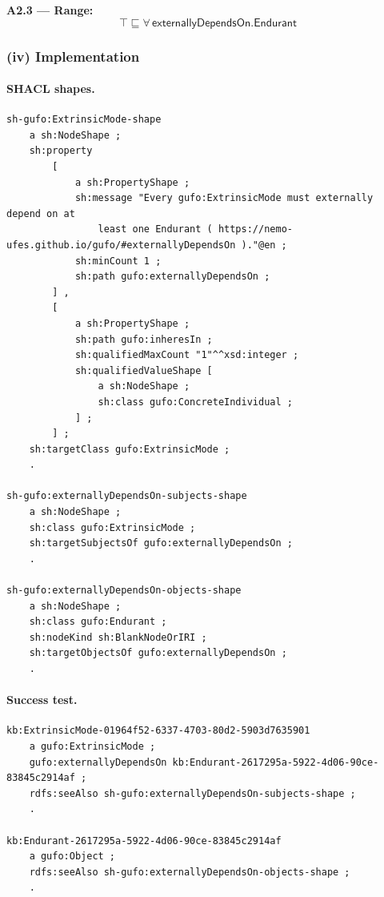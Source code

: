 \documentclass[12pt,a4paper]{article}
\begin{document}
\textbf{A2.3 --- Range:}
\begin{equation*}
  \top \sqsubseteq \forall\,\mathsf{externallyDependsOn}.\mathsf{Endurant}
\end{equation*}

\subsubsection*{(iv) Implementation}

\paragraph{SHACL shapes.}

\begin{lstlisting}[style=turtlestyle]
sh-gufo:ExtrinsicMode-shape
    a sh:NodeShape ;
    sh:property
        [
            a sh:PropertyShape ;
            sh:message "Every gufo:ExtrinsicMode must externally depend on at
                least one Endurant ( https://nemo-ufes.github.io/gufo/#externallyDependsOn )."@en ;
            sh:minCount 1 ;
            sh:path gufo:externallyDependsOn ;
        ] ,
        [
            a sh:PropertyShape ;
            sh:path gufo:inheresIn ;
            sh:qualifiedMaxCount "1"^^xsd:integer ;
            sh:qualifiedValueShape [
                a sh:NodeShape ;
                sh:class gufo:ConcreteIndividual ;
            ] ;
        ] ;
    sh:targetClass gufo:ExtrinsicMode ;
    .

sh-gufo:externallyDependsOn-subjects-shape
    a sh:NodeShape ;
    sh:class gufo:ExtrinsicMode ;
    sh:targetSubjectsOf gufo:externallyDependsOn ;
    .

sh-gufo:externallyDependsOn-objects-shape
    a sh:NodeShape ;
    sh:class gufo:Endurant ;
    sh:nodeKind sh:BlankNodeOrIRI ;
    sh:targetObjectsOf gufo:externallyDependsOn ;
    .
\end{lstlisting}

\paragraph{Success test.}

\begin{lstlisting}[style=turtlestyle]
kb:ExtrinsicMode-01964f52-6337-4703-80d2-5903d7635901
    a gufo:ExtrinsicMode ;
    gufo:externallyDependsOn kb:Endurant-2617295a-5922-4d06-90ce-83845c2914af ;
    rdfs:seeAlso sh-gufo:externallyDependsOn-subjects-shape ;
    .

kb:Endurant-2617295a-5922-4d06-90ce-83845c2914af
    a gufo:Object ;
    rdfs:seeAlso sh-gufo:externallyDependsOn-objects-shape ;
    .
\end{lstlisting}
\end{document}

